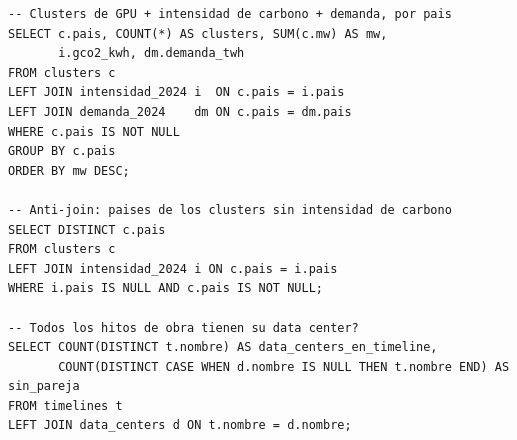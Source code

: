 \documentclass[11pt,a4paper]{article}
\begin{document}
\begin{lstlisting}
-- Clusters de GPU + intensidad de carbono + demanda, por pais
SELECT c.pais, COUNT(*) AS clusters, SUM(c.mw) AS mw,
       i.gco2_kwh, dm.demanda_twh
FROM clusters c
LEFT JOIN intensidad_2024 i  ON c.pais = i.pais
LEFT JOIN demanda_2024    dm ON c.pais = dm.pais
WHERE c.pais IS NOT NULL
GROUP BY c.pais
ORDER BY mw DESC;

-- Anti-join: paises de los clusters sin intensidad de carbono
SELECT DISTINCT c.pais
FROM clusters c
LEFT JOIN intensidad_2024 i ON c.pais = i.pais
WHERE i.pais IS NULL AND c.pais IS NOT NULL;

-- Todos los hitos de obra tienen su data center?
SELECT COUNT(DISTINCT t.nombre) AS data_centers_en_timeline,
       COUNT(DISTINCT CASE WHEN d.nombre IS NULL THEN t.nombre END) AS sin_pareja
FROM timelines t
LEFT JOIN data_centers d ON t.nombre = d.nombre;
\end{lstlisting}
\end{document}
